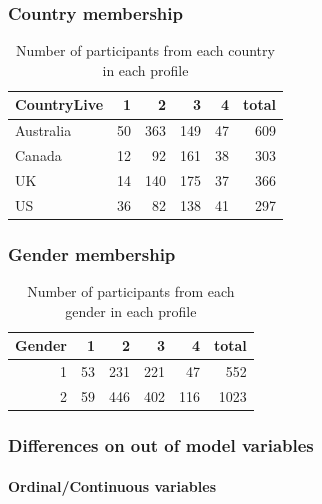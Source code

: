 \documentclass[]{article}
\let\oldparagraph\paragraph
\renewcommand{\paragraph}[1]{\oldparagraph{#1}\mbox{}}
\begin{document}
\hypertarget{country-membership-2}{%
\subsubsection{Country membership}\label{country-membership-2}}

\begin{table}[H]

\caption{\label{tab:unnamed-chunk-23}Number of participants from each country in each profile}
\centering
\fontsize{6}{8}\selectfont
\begin{tabular}[t]{lrrrrr}
\toprule
CountryLive & 1 & 2 & 3 & 4 & total\\
\midrule
Australia & 50 & 363 & 149 & 47 & 609\\
Canada & 12 & 92 & 161 & 38 & 303\\
UK & 14 & 140 & 175 & 37 & 366\\
US & 36 & 82 & 138 & 41 & 297\\
\bottomrule
\end{tabular}
\end{table}

\hypertarget{gender-membership-2}{%
\subsubsection{Gender membership}\label{gender-membership-2}}

\begin{table}[H]

\caption{\label{tab:unnamed-chunk-24}Number of participants from each gender in each profile}
\centering
\fontsize{6}{8}\selectfont
\begin{tabular}[t]{rrrrrr}
\toprule
Gender & 1 & 2 & 3 & 4 & total\\
\midrule
1 & 53 & 231 & 221 & 47 & 552\\
2 & 59 & 446 & 402 & 116 & 1023\\
\bottomrule
\end{tabular}
\end{table}

\newpage

\hypertarget{differences-on-out-of-model-variables-2}{%
\subsubsection{Differences on out of model
variables}\label{differences-on-out-of-model-variables-2}}

\hypertarget{ordinalcontinuous-variables-2}{%
\paragraph{Ordinal/Continuous
variables}\label{ordinalcontinuous-variables-2}}
\end{document}
